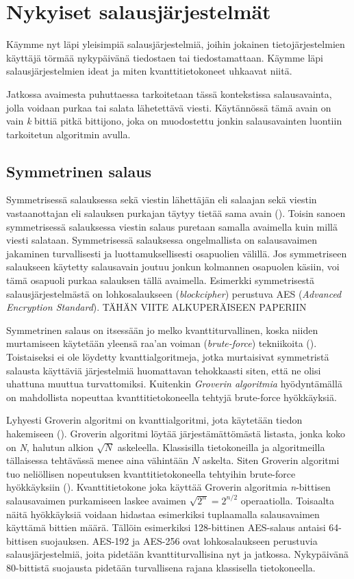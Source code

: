 \chapter{Nykyiset salausjärjestelmät\label{methods}}

Käymme nyt läpi yleisimpiä salausjärjestelmiä, joihin jokainen tietojärjestelmien käyttäjä törmää nykypäivänä tiedostaen tai tiedostamattaan. Käymme läpi salausjärjestelmien ideat ja miten kvanttitietokoneet uhkaavat niitä.

Jatkossa avaimesta puhuttaessa tarkoitetaan tässä kontekstissa salausavainta, jolla voidaan purkaa tai salata lähetettävä viesti. Käytännössä tämä avain on vain \emph{k} bittiä pitkä bittijono, joka on muodostettu jonkin salausavainten luontiin tarkoitetun algoritmin avulla.

\section{Symmetrinen salaus}
 Symmetrisessä salauksessa sekä viestin lähettäjän eli salaajan sekä viestin vastaanottajan eli salauksen purkajan täytyy tietää sama avain (\cite{bellare2005introduction}). Toisin sanoen symmetrisessä salauksessa viestin salaus puretaan samalla avaimella kuin millä viesti salataan.  Symmetrisessä salauksessa ongelmallista on salausavaimen jakaminen turvallisesti ja luottamuksellisesti osapuolien välillä. Jos symmetriseen salaukseen käytetty salausavain joutuu jonkun kolmannen osapuolen käsiin, voi tämä osapuoli purkaa salauksen tällä avaimella. Esimerkki symmetrisestä salausjärjestelmästä on lohkosalaukseen (\emph{blockcipher}) perustuva AES (\emph{Advanced Encryption Standard}). TÄHÄN VIITE ALKUPERÄISEEN PAPERIIN
 
 Symmetrinen salaus on itsessään jo melko kvanttiturvallinen, koska niiden murtamiseen käytetään yleensä raa'an voiman (\emph{brute-force}) tekniikoita (\cite{mavroeidis2018impact}). Toistaiseksi ei ole löydetty kvanttialgoritmeja, jotka murtaisivat symmetristä salausta käyttäviä järjestelmiä huomattavan tehokkaasti siten, että ne olisi uhattuna muuttua turvattomiksi. Kuitenkin \emph{Groverin algoritmia} hyödyntämällä on mahdollista nopeuttaa kvanttitietokoneella tehtyjä brute-force hyökkäyksiä.
 
 Lyhyesti Groverin algoritmi on kvanttialgoritmi, jota käytetään tiedon hakemiseen (\cite{hayward2008quantum}). Groverin algoritmi löytää järjestämättömästä listasta, jonka koko on \emph{N}, halutun alkion $\sqrt{N}$ askeleella. Klassisilla tietokoneilla ja algoritmeilla tällaisessa tehtävässä menee aina vähintään $N$ askelta. Siten Groverin algoritmi tuo neliöllisen nopeutuksen kvanttitietokoneella tehtyihin brute-force hyökkäyksiin (\cite{mavroeidis2018impact}). Kvanttitietokone joka käyttää Groverin algoritmia \emph{n}-bittisen salausavaimen purkamiseen laskee avaimen $\sqrt{2^{n}} = 2^{n/2}$ operaatiolla. Toisaalta näitä hyökkäyksiä voidaan hidastaa esimerkiksi tuplaamalla salausavaimen käyttämä bittien määrä. Tällöin esimerkiksi 128-bittinen AES-salaus antaisi 64-bittisen suojauksen. AES-192 ja AES-256 ovat lohkosalaukseen perustuvia salausjärjestelmiä, joita pidetään kvanttiturvallisina nyt ja jatkossa. Nykypäivänä 80-bittistä suojausta pidetään turvallisena rajana klassisella tietokoneella.
 
